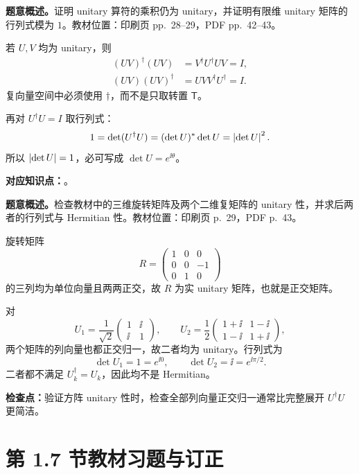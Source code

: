 \textbf{题意概述。}证明 unitary 算符的乘积仍为 unitary，并证明有限维 unitary 矩阵的行列式模为 $1$。教材位置：印刷页 pp.~28--29，PDF pp.~42--43。

\begin{checkedsolution}
若 $U,V$ 均为 unitary，则
\begin{align*}
  (UV)^\dagger(UV)
  &=V^\dagger U^\dagger UV=I,\\
  (UV)(UV)^\dagger
  &=UVV^\dagger U^\dagger=I.
\end{align*}
复向量空间中必须使用 $\dagger$，而不是只取转置 $\mathsf T$。

再对 $U^\dagger U=I$ 取行列式：
\[
  1=\det(U^\dagger U)
  =(\det U)^*\det U
  =\left|\det U\right|^2.
\]
所以 $\left|\det U\right|=1$，必可写成 $\det U=e^{\ii\theta}$。
\end{checkedsolution}


\textbf{对应知识点：}。

\textbf{题意概述。}检查教材中的三维旋转矩阵及两个二维复矩阵的 unitary 性，并求后两者的行列式与 Hermitian 性。教材位置：印刷页 p.~29，PDF p.~43。

\begin{checkedsolution}
旋转矩阵
\[
  R=
  \begin{pmatrix}
    1&0&0\\0&0&-1\\0&1&0
  \end{pmatrix}
\]
的三列均为单位向量且两两正交，故 $R$ 为实 unitary 矩阵，也就是正交矩阵。

对
\[
  U_1=\frac{1}{\sqrt2}
  \begin{pmatrix}1&\ii\\\ii&1\end{pmatrix},
  \qquad
  U_2=\frac12
  \begin{pmatrix}1+\ii&1-\ii\\1-\ii&1+\ii\end{pmatrix},
\]
两个矩阵的列向量也都正交归一，故二者均为 unitary。行列式为
\[
  \det U_1=1=e^{\ii0},
  \qquad
  \det U_2=\ii=e^{\ii\pi/2}.
\]
二者都不满足 $U_k^\dagger=U_k$，因此均不是 Hermitian。
\end{checkedsolution}

\textbf{检查点：}验证方阵 unitary 性时，检查全部列向量正交归一通常比完整展开 $U^\dagger U$ 更简洁。

\section{第 1.7 节教材习题与订正}
\label{exercise-set:QM-C01-S07}

